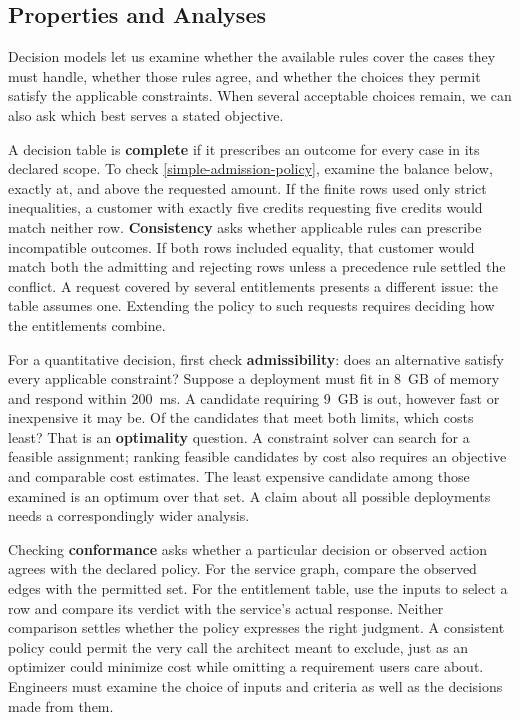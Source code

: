 \subsection{Properties and Analyses}\label{heading:decision-properties-and-analyses}

Decision models let us examine whether the available rules cover the cases they must handle, whether those rules agree, and whether the choices they permit satisfy the applicable constraints. When several acceptable choices remain, we can also ask which best serves a stated objective.


A decision table is \textbf{complete} if it prescribes an outcome for every case in its declared scope. To check \autoref{simple-admission-policy}, examine the balance below, exactly at, and above the requested amount. If the finite rows used only strict inequalities, a customer with exactly five credits requesting five credits would match neither row. \textbf{Consistency} asks whether applicable rules can prescribe incompatible outcomes. If both rows included equality, that customer would match both the admitting and rejecting rows unless a precedence rule settled the conflict. A request covered by several entitlements presents a different issue: the table assumes one. Extending the policy to such requests requires deciding how the entitlements combine.

For a quantitative decision, first check \textbf{admissibility}: does an alternative satisfy every applicable constraint? Suppose a deployment must fit in 8~GB of memory and respond within 200~ms. A candidate requiring 9~GB is out, however fast or inexpensive it may be. Of the candidates that meet both limits, which costs least? That is an \textbf{optimality} question. A constraint solver can search for a feasible assignment; ranking feasible candidates by cost also requires an objective and comparable cost estimates. The least expensive candidate among those examined is an optimum over that set. A claim about all possible deployments needs a correspondingly wider analysis.

Checking \textbf{conformance} asks whether a particular decision or observed action agrees with the declared policy. For the service graph, compare the observed edges with the permitted set. For the entitlement table, use the inputs to select a row and compare its verdict with the service's actual response. Neither comparison settles whether the policy expresses the right judgment. A consistent policy could permit the very call the architect meant to exclude, just as an optimizer could minimize cost while omitting a requirement users care about. Engineers must examine the choice of inputs and criteria as well as the decisions made from them.


